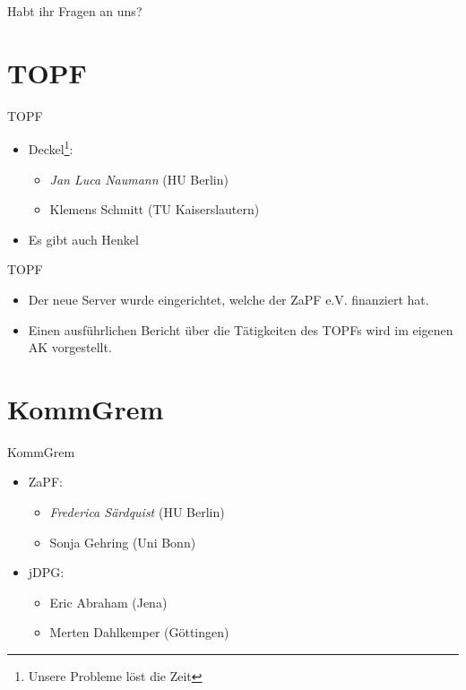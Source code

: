 \documentclass[compress, aspectratio=169]{beamer}
\begin{document}
\begin{frame}[plain]
  \begin{center}
    \Huge Habt ihr Fragen an uns?
    \end{center}
\end{frame}

\section{TOPF}
\begin{frame}{TOPF}
  \begin{itemize}
    \item[] Deckel\footnote{Unsere Probleme löst die Zeit}:
      \begin{itemize}
      \item \emph{Jan Luca Naumann} (HU Berlin)
      \item Klemens Schmitt (TU Kaiserslautern)
      \end{itemize}
    \item[] Es gibt auch Henkel
    \end{itemize}
\end{frame}

\begin{frame}{TOPF}
  \begin{itemize}
  \item Der neue Server wurde eingerichtet, welche der ZaPF e.V. finanziert hat.
  \item Einen ausführlichen Bericht über die Tätigkeiten des TOPFs wird im eigenen AK vorgestellt.
  \end{itemize}
\end{frame}

\section{KommGrem}

\begin{frame}{KommGrem}
  \begin{itemize}
  \item[] ZaPF:
    \begin{itemize}
    \item \emph{Frederica Särdquist} (HU Berlin)
    \item Sonja Gehring (Uni Bonn)
    \end{itemize}
  \item[] jDPG:
    \begin{itemize}
    \item Eric Abraham (Jena)
    \item Merten Dahlkemper (Göttingen)
    \end{itemize}
  \end{itemize}
  \vspace{0.5cm}
\end{frame}
\end{document}
